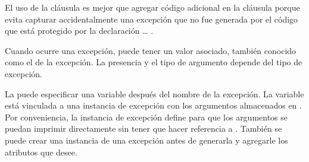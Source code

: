 \documentclass[a4,10pt,spanish]{sphinxmanual}
\begin{document}
\sphinxAtStartPar
El uso de la cláusula  es mejor que agregar código adicional en la cláusula  porque evita capturar accidentalmente una excepción que no fue generada por el código que está protegido por la declaración  … .

\sphinxAtStartPar
Cuando ocurre una excepción, puede tener un valor asociado, también conocido como el  de la excepción.  La presencia y el tipo de argumento depende del tipo de excepción.

\sphinxAtStartPar
La  puede especificar una variable después del nombre de la excepción. La variable está vinculada a una instancia de excepción con los argumentos almacenados en . Por conveniencia, la instancia de excepción define  para que los argumentos se puedan imprimir directamente sin tener que hacer referencia a . También se puede crear una instancia de una excepción antes de generarla y agregarle los atributos que desee.

\begin{sphinxVerbatim}[commandchars=\\\{\}]
      
   
        
         
              
                         
            
     
     
\end{sphinxVerbatim}
\end{document}
